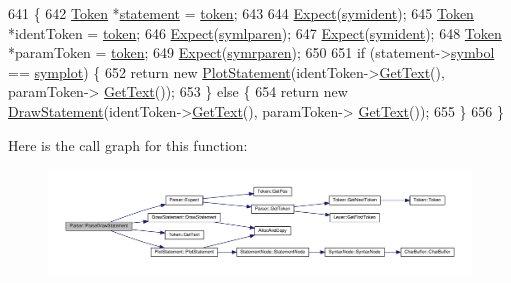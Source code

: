 \begin{DoxyCode}
641 \{
642     \hyperlink{structToken}{Token} *\hyperlink{nodes_8h_acac9cbaeea226ed297804c012dc12b16a338f0b1773c656a2647feb9e2bf6be09}{statement} = \hyperlink{classParser_a467028559d31c5b33f16ca8be56715cc}{token};
643 
644     \hyperlink{classParser_a811765334b0cd3f01152c35c9f5bcaec}{Expect}(\hyperlink{lex_8h_a7feef761cd73fac6e25b8bb80d2c4e54ade7694e5efc9616383548e57122faea5}{symident});
645     \hyperlink{structToken}{Token} *identToken = \hyperlink{classParser_a467028559d31c5b33f16ca8be56715cc}{token};
646     \hyperlink{classParser_a811765334b0cd3f01152c35c9f5bcaec}{Expect}(\hyperlink{lex_8h_a7feef761cd73fac6e25b8bb80d2c4e54ad92b5471ad4a0b9fc95faae6ca2172ad}{symlparen});
647     \hyperlink{classParser_a811765334b0cd3f01152c35c9f5bcaec}{Expect}(\hyperlink{lex_8h_a7feef761cd73fac6e25b8bb80d2c4e54ade7694e5efc9616383548e57122faea5}{symident});
648     \hyperlink{structToken}{Token} *paramToken = \hyperlink{classParser_a467028559d31c5b33f16ca8be56715cc}{token};
649     \hyperlink{classParser_a811765334b0cd3f01152c35c9f5bcaec}{Expect}(\hyperlink{lex_8h_a7feef761cd73fac6e25b8bb80d2c4e54a59c8837a9f31298813b4703cefbd185e}{symrparen});
650 
651     \textcolor{keywordflow}{if} (statement->\hyperlink{structToken_aa671eaaae5632c5277e89a090d864820}{symbol} == \hyperlink{lex_8h_a7feef761cd73fac6e25b8bb80d2c4e54acda5f0902987563127f09bff0f941be6}{symplot}) \{
652         \textcolor{keywordflow}{return} \textcolor{keyword}{new} \hyperlink{classPlotStatement}{PlotStatement}(identToken->\hyperlink{structToken_a15f1043de07ce8e452fbf115b85def71}{GetText}(), paramToken->
      \hyperlink{structToken_a15f1043de07ce8e452fbf115b85def71}{GetText}());
653     \} \textcolor{keywordflow}{else} \{
654         \textcolor{keywordflow}{return} \textcolor{keyword}{new} \hyperlink{classDrawStatement}{DrawStatement}(identToken->\hyperlink{structToken_a15f1043de07ce8e452fbf115b85def71}{GetText}(), paramToken->
      \hyperlink{structToken_a15f1043de07ce8e452fbf115b85def71}{GetText}());
655     \}
656 \}
\end{DoxyCode}


Here is the call graph for this function\+:
\nopagebreak
\begin{figure}[H]
\begin{center}
\leavevmode
\includegraphics[width=350pt]{d0/d40/classParser_a38a55851f31c226c193090403dfbaff8_cgraph}
\end{center}
\end{figure}




